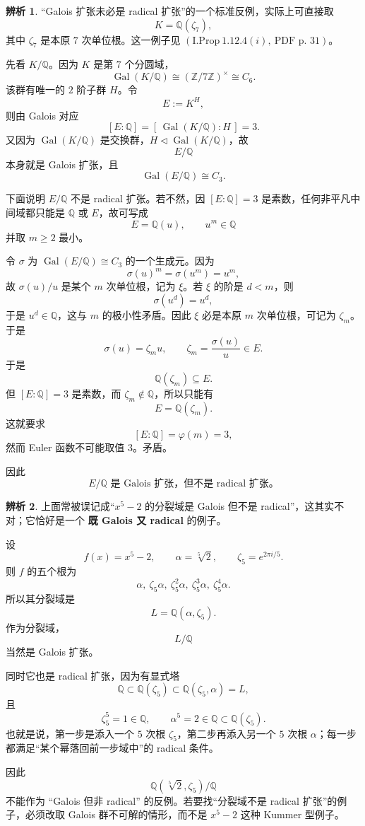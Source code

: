 \documentclass[a4paper]{ctexart}
\theoremstyle{definition}
\theoremstyle{analysis}
\newtheorem{remark}{辨析}[section]
\theoremstyle{plain}
\begin{document}
\begin{remark}
\label{rem:galois-not-radical}
“Galois 扩张未必是 radical 扩张”的一个标准反例，实际上可直接取
\[
  K=\mathbb Q(\zeta_7),
\]
其中 \(\zeta_7\) 是本原 \(7\) 次单位根。这一例子见
\((\mathrm{I.Prop}\ 1.12.4(i),\ \text{PDF p.\ 31})\)。

先看 \(K/\mathbb Q\)。因为 \(K\) 是第 \(7\) 个分圆域，
\[
  \operatorname{Gal}(K/\mathbb Q)\cong (\mathbb Z/7\mathbb Z)^\times\cong C_6.
\]
该群有唯一的 \(2\) 阶子群 \(H\)。令
\[
  E:=K^H,
\]
则由 Galois 对应
\[
  [E:\mathbb Q]=[\,\operatorname{Gal}(K/\mathbb Q):H\,]=3.
\]
又因为 \(\operatorname{Gal}(K/\mathbb Q)\) 是交换群，\(H\triangleleft \operatorname{Gal}(K/\mathbb Q)\)，故
\[
  E/\mathbb Q
\]
本身就是 Galois 扩张，且
\[
  \operatorname{Gal}(E/\mathbb Q)\cong C_3.
\]

下面说明 \(E/\mathbb Q\) 不是 radical 扩张。若不然，因 \([E:\mathbb Q]=3\) 是素数，任何非平凡中间域都只能是 \(\mathbb Q\) 或 \(E\)，故可写成
\[
  E=\mathbb Q(u),\qquad u^m\in \mathbb Q
\]
并取 \(m\ge 2\) 最小。

令 \(\sigma\) 为 \(\operatorname{Gal}(E/\mathbb Q)\cong C_3\) 的一个生成元。因为
\[
  \sigma(u)^m=\sigma(u^m)=u^m,
\]
故 \(\sigma(u)/u\) 是某个 \(m\) 次单位根，记为 \(\xi\)。若 \(\xi\) 的阶是 \(d<m\)，则
\[
  \sigma(u^d)=u^d,
\]
于是 \(u^d\in \mathbb Q\)，这与 \(m\) 的极小性矛盾。因此 \(\xi\) 必是本原 \(m\) 次单位根，可记为 \(\zeta_m\)。于是
\[
  \sigma(u)=\zeta_m u,
  \qquad
  \zeta_m=\frac{\sigma(u)}{u}\in E.
\]
于是
\[
  \mathbb Q(\zeta_m)\subseteq E.
\]
但 \([E:\mathbb Q]=3\) 是素数，而 \(\zeta_m\notin \mathbb Q\)，所以只能有
\[
  E=\mathbb Q(\zeta_m).
\]
这就要求
\[
  [E:\mathbb Q]=\varphi(m)=3,
\]
然而 Euler 函数不可能取值 \(3\)。矛盾。

因此
\[
  E/\mathbb Q\text{ 是 Galois 扩张，但不是 radical 扩张。}
\]
\end{remark}

\begin{remark}
\label{rem:x5-splitting-radical}
上面常被误记成“\(x^5-2\) 的分裂域是 Galois 但不是 radical”，这其实不对；它恰好是一个
\textbf{既 Galois 又 radical} 的例子。

设
\[
  f(x)=x^5-2,\qquad \alpha=\sqrt[5]{2},\qquad \zeta_5=e^{2\pi i/5}.
\]
则 \(f\) 的五个根为
\[
  \alpha,\ \zeta_5\alpha,\ \zeta_5^2\alpha,\ \zeta_5^3\alpha,\ \zeta_5^4\alpha.
\]
所以其分裂域是
\[
  L=\mathbb Q(\alpha,\zeta_5).
\]
作为分裂域，
\[
  L/\mathbb Q
\]
当然是 Galois 扩张。

同时它也是 radical 扩张，因为有显式塔
\[
  \mathbb Q
  \subset
  \mathbb Q(\zeta_5)
  \subset
  \mathbb Q(\zeta_5,\alpha)=L,
\]
且
\[
  \zeta_5^5=1\in \mathbb Q,\qquad \alpha^5=2\in \mathbb Q\subset \mathbb Q(\zeta_5).
\]
也就是说，第一步是添入一个 \(5\) 次根 \( \zeta_5\)，第二步再添入另一个 \(5\) 次根 \(\alpha\)；每一步都满足“某个幂落回前一步域中”的 radical 条件。

因此
\[
  \mathbb Q(\sqrt[5]{2},\zeta_5)/\mathbb Q
\]
不能作为 “Galois 但非 radical” 的反例。若要找“分裂域不是 radical 扩张”的例子，必须改取 Galois 群不可解的情形，而不是 \(x^5-2\) 这种 Kummer 型例子。
\end{remark}
\end{document}
